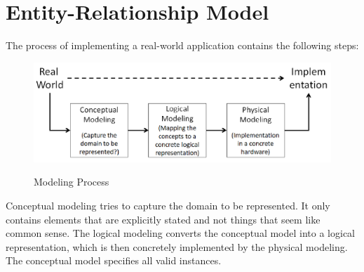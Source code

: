 \section{Entity-Relationship Model}
The process of implementing a real-world application contains the following steps:
\begin{figure}[H]
\centering
\includegraphics[width=.8\textwidth]{images/implementation.PNG}
\label{implementation}
\caption{Modeling Process}
\end{figure}
Conceptual modeling tries to capture the domain to be represented. It only contains elements that are explicitly stated and not things that seem like common sense. The logical modeling converts the conceptual model into a logical representation, which is then concretely implemented by the physical modeling.\\
The conceptual model specifies all valid instances. \vspace{.3cm}\\

